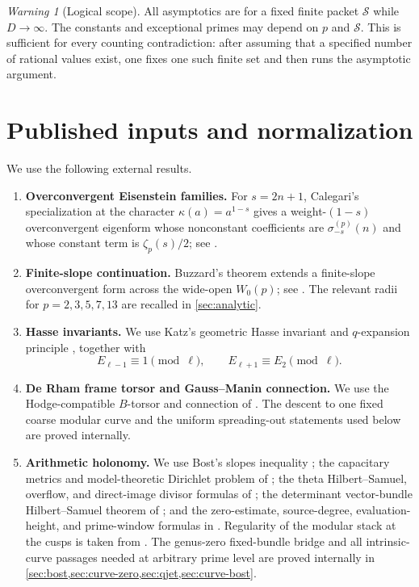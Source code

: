 \documentclass[11pt]{article}
\theoremstyle{definition}
\theoremstyle{remark}
\newtheorem{warning}[warning]{Warning}
\begin{document}
\begin{warning}[Logical scope]\label{warn:scope}
All asymptotics are for a fixed finite packet $\mathcal S$ while $D\to\infty$.
The constants and exceptional primes may depend on $p$ and $\mathcal S$.
This is sufficient for every counting contradiction: after assuming that a
specified number of rational values exist, one fixes one such finite set and
then runs the asymptotic argument.
\end{warning}

\section{Published inputs and normalization}\label{sec:inputs}

We use the following external results.

\begin{enumerate}[label=\textup{(E\arabic*)},leftmargin=3em]
\item \textbf{Overconvergent Eisenstein families.}
For $s=2n+1$, Calegari's specialization at the character
$\kappa(a)=a^{1-s}$ gives a weight-$(1-s)$ overconvergent eigenform whose
nonconstant coefficients are $\sigma_{-s}^{(p)}(n)$ and whose constant term is
$\zeta_p(s)/2$; see \cite[Theorem~2.3 and Lemma~2.4]{Calegari2005}.

\item \textbf{Finite-slope continuation.}
Buzzard's theorem extends a finite-slope overconvergent form across the
wide-open $W_0(p)$; see \cite[Theorem~5.2]{Buzzard2003}.  The relevant radii
for $p=2,3,5,7,13$ are recalled in \cref{sec:analytic}.

\item \textbf{Hasse invariants.}
We use Katz's geometric Hasse invariant and $q$-expansion principle
\cite{Katz1973}, together with
\[
 E_{\ell-1}\equiv1\pmod\ell,
 \qquad E_{\ell+1}\equiv E_2\pmod\ell.
\]

\item \textbf{De Rham frame torsor and Gauss--Manin connection.}
We use the Hodge-compatible $B$-torsor and connection of
\cite[Propositions~A.14--A.15]{GPRJ2025}.  The descent to one fixed coarse
modular curve and the uniform spreading-out statements used below are proved
internally.

\item \textbf{Arithmetic holonomy.}
We use Bost's slopes inequality \cite{Bost2001}; the capacitary metrics
and model-theoretic Dirichlet problem of \cite{BostChambertLoir2009}; the
theta Hilbert--Samuel, overflow, and direct-image divisor formulas of
\cite{BostCharles2022}; the determinant vector-bundle Hilbert--Samuel theorem
of \cite[Corollary~4.5.2]{ChenMoriwaki2024}; and the zero-estimate,
source-degree, evaluation-height, and prime-window formulas in
\cite{CDT2024,CDT2025}.
Regularity of the modular stack at the cusps is taken from
\cite{Cesnavicius2017}.  The genus-zero fixed-bundle bridge and all
intrinsic-curve passages needed at arbitrary prime level are proved
internally in \cref{sec:bost,sec:curve-zero,sec:qjet,sec:curve-bost}.
\end{enumerate}
\end{document}
